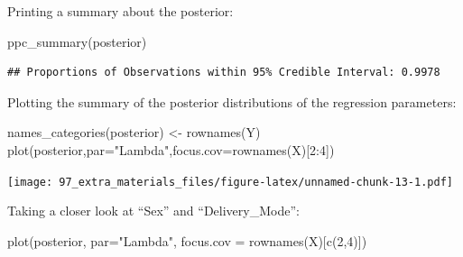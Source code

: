 \documentclass[
]{book}
\newenvironment{Shaded}{\begin{snugshade}}{\end{snugshade}}
\newcommand{\AttributeTok}[1]{\textcolor[rgb]{0.77,0.63,0.00}{#1}}
\newcommand{\CommentTok}[1]{\textcolor[rgb]{0.56,0.35,0.01}{\textit{#1}}}
\newcommand{\DecValTok}[1]{\textcolor[rgb]{0.00,0.00,0.81}{#1}}
\newcommand{\FloatTok}[1]{\textcolor[rgb]{0.00,0.00,0.81}{#1}}
\newcommand{\FunctionTok}[1]{\textcolor[rgb]{0.00,0.00,0.00}{#1}}
\newcommand{\NormalTok}[1]{#1}
\newcommand{\OtherTok}[1]{\textcolor[rgb]{0.56,0.35,0.01}{#1}}
\newcommand{\SpecialCharTok}[1]{\textcolor[rgb]{0.00,0.00,0.00}{#1}}
\newcommand{\StringTok}[1]{\textcolor[rgb]{0.31,0.60,0.02}{#1}}
\begin{document}
\begin{Shaded}
\end{Shaded}

Printing a summary about the posterior:

\begin{Shaded}
\begin{Highlighting}[]
\FunctionTok{ppc\_summary}\NormalTok{(posterior)}
\end{Highlighting}
\end{Shaded}

\begin{verbatim}
## Proportions of Observations within 95% Credible Interval: 0.9978
\end{verbatim}

Plotting the summary of the posterior distributions of the regression parameters:

\begin{Shaded}
\begin{Highlighting}[]
\FunctionTok{names\_categories}\NormalTok{(posterior) }\OtherTok{\textless{}{-}} \FunctionTok{rownames}\NormalTok{(Y)}
\FunctionTok{plot}\NormalTok{(posterior,}\AttributeTok{par=}\StringTok{"Lambda"}\NormalTok{,}\AttributeTok{focus.cov=}\FunctionTok{rownames}\NormalTok{(X)[}\DecValTok{2}\SpecialCharTok{:}\DecValTok{4}\NormalTok{])}
\end{Highlighting}
\end{Shaded}

\texttt{[image: 97\_extra\_materials\_files/figure-latex/unnamed-chunk-13-1.pdf]}

Taking a closer look at ``Sex'' and ``Delivery\_Mode'':

\begin{Shaded}
\begin{Highlighting}[]
\FunctionTok{plot}\NormalTok{(posterior, }\AttributeTok{par=}\StringTok{"Lambda"}\NormalTok{, }\AttributeTok{focus.cov =} \FunctionTok{rownames}\NormalTok{(X)[}\FunctionTok{c}\NormalTok{(}\DecValTok{2}\NormalTok{,}\DecValTok{4}\NormalTok{)])}
\end{Highlighting}
\end{Shaded}
\end{document}
